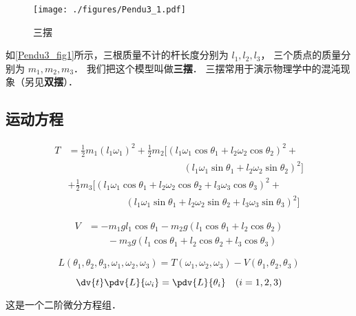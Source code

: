 
\begin{figure}[ht]
\centering
\texttt{[image: ./figures/Pendu3\_1.pdf]}
\caption{三摆} \label{Pendu3_fig1}
\end{figure}
如\autoref{Pendu3_fig1}所示，三根质量不计的杆长度分别为 $l_1, l_2, l_3$， 三个质点的质量分别为 $m_1, m_2, m_3$． 我们把这个模型叫做\textbf{三摆}． 三摆常用于演示物理学中的混沌现象（另见\textbf{双摆}）．%
 
\subsection{运动方程}

\begin{equation}
\begin{aligned}
T &= \frac{1}{2} m_1 (l_1 \omega_1)^2 + \frac{1}{2} m_2 [(l_1 \omega_1 \cos\theta_1 + l_2 \omega_2 \cos\theta_2)^2 +\\
&\qquad \qquad\qquad\qquad\qquad\qquad (l_1 \omega_1 \sin\theta_1 + l_2 \omega_2 \sin\theta_2)^2]\\
& + \frac{1}{2} m_3 [(l_1 \omega_1 \cos\theta_1 + l_2 \omega_2 \cos\theta_2 + l_3 \omega_3 \cos \theta_3)^2 +\\
&\qquad\qquad\qquad (l_1 \omega_1 \sin\theta_1 + l_2 \omega_2 \sin\theta_2 + l_3 \omega_3 \sin\theta_3)^2]
\end{aligned}
\end{equation}

\begin{equation} 
\begin{aligned}
V &= -m_1 g l_1 \cos \theta_1 - m_2 g (l_1\cos \theta_1 + l_2 \cos \theta_2)\\
&\qquad - m_3 g (l_1 \cos\theta_1 + l_2 \cos \theta_2 + l_3 \cos \theta_3)
\end{aligned}
\end{equation}

\begin{equation}
L(\theta_1, \theta_2, \theta_3, \omega_1, \omega_2, \omega_3) = T(\omega_1, \omega_2, \omega_3) - V(\theta_1, \theta_2, \theta_3)
\end{equation}

\begin{equation}
\dv{t} \pdv{L}{\omega_i} = \pdv{L}{\theta_i} \quad (i=1,2,3)
\end{equation}

这是一个二阶微分方程组．

